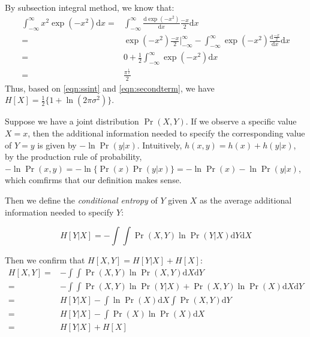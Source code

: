 By subsection integral method, we know that:
\begin{equation}
\begin{split}
\int_{-\infty}^{\infty}x^{2}\exp{}(-x^2)\text{d}x=&\int_{-\infty}^{\infty}\frac{\text{d}\exp{}(-x^2)}{\text{d}x}\frac{-x}{2}\text{d}x\\
=&\exp{}(-x^2)\frac{-x}{2}\vert_{-\infty}^{\infty}-\int_{-\infty}^{\infty}\exp{}(-x^2)\frac{\text{d}\frac{-x}{2}}{\text{d}x}\text{d}x\\
=&0+\frac{1}{2}\int_{-\infty}^{\infty}\exp{}(-x^2)\text{d}x\\
=&\frac{\pi^{\frac{1}{2}}}{2}
\end{split}
\label{eqn:ssint}
\end{equation}
Thus, based on \eqref{eqn:ssint} and \eqref{eqn:secondterm}, we have
$H[X]=\frac{1}{2}\{1+\ln{}(2\pi\sigma^2)\}$.


Suppose we have a joint distribution $\Pr(X,Y)$. If we observe a
specific value $X=x$, then the additional information needed to
specify the corresponding value of $Y=y$ is given by
$-\ln{}\Pr(y\vert{}x)$. Intuitively, $h(x,y)=h(x)+h(y\vert{}x)$, by
the production rule of probability,
    $-\ln{}\Pr(x,y)=-\ln{}\{\Pr(x)\Pr(y\vert{}x)\}=-\ln{}\Pr(x)-\ln{}\Pr(y\vert{}x)$,
    which comfirms that our definition makes sense.
    
    
Then we define the \emph{conditional entropy} of $Y$ given $X$ as the
average additional information needed to specify $Y$:
\begin{definition}
\begin{equation}
H[Y\vert{}X]=-\int{}\int{}\Pr(X,Y)\ln{}\Pr(Y\vert{}X)\text{d}Y\text{d}X
\label{eqn:conditionalentropy}
\end{equation}
\end{definition}
Then we confirm that $H[X,Y]=H[Y\vert{}X]+H[X]$:
\begin{equation}
\begin{split}
H[X,Y]=&-\int{}\int{}\Pr(X,Y)\ln{}\Pr(X,Y)\text{d}X\text{d}Y\\
=&-\int{}\int{}\Pr(X,Y)\ln{}\Pr(Y\vert{}X)+\Pr(X,Y)\ln{}\Pr(X)\text{d}X\text{d}Y\\
=&H[Y\vert{}X]-\int{}\ln{}\Pr(X)\text{d}X\int{}\Pr(X,Y)\text{d}Y\\
=&H[Y\vert{}X]-\int{}\Pr(X)\ln{}\Pr(X)\text{d}X\\
=&H[Y\vert{}X]+H[X]
\end{split}
\label{eqn:condhhh}
\end{equation}

